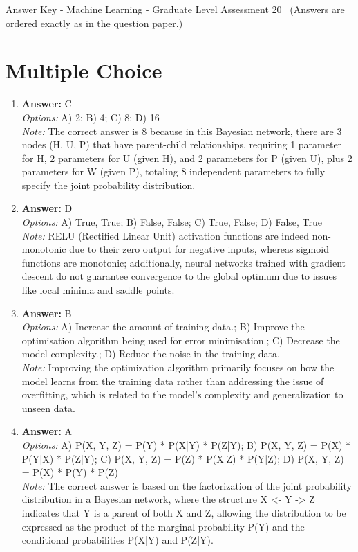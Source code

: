 \documentclass[12pt]{article}
\begin{document}
\begin{center}
Answer Key - Machine Learning - Graduate Level Assessment 20 \
\small (Answers are ordered exactly as in the question paper.)
\end{center}

\section*{Multiple Choice}
\begin{enumerate}[label=\arabic*.]
\item \textbf{Answer:} C
\\ \textit{Options:} A) 2; B) 4; C) 8; D) 16
\\ \textit{Note:} The correct answer is 8 because in this Bayesian network, there are 3 nodes (H, U, P) that have parent-child relationships, requiring 1 parameter for H, 2 parameters for U (given H), and 2 parameters for P (given U), plus 2 parameters for W (given P), totaling 8 independent parameters to fully specify the joint probability distribution.
\item \textbf{Answer:} D
\\ \textit{Options:} A) True, True; B) False, False; C) True, False; D) False, True
\\ \textit{Note:} RELU (Rectified Linear Unit) activation functions are indeed non-monotonic due to their zero output for negative inputs, whereas sigmoid functions are monotonic; additionally, neural networks trained with gradient descent do not guarantee convergence to the global optimum due to issues like local minima and saddle points.
\item \textbf{Answer:} B
\\ \textit{Options:} A) Increase the amount of training data.; B) Improve the optimisation algorithm being used for error minimisation.; C) Decrease the model complexity.; D) Reduce the noise in the training data.
\\ \textit{Note:} Improving the optimization algorithm primarily focuses on how the model learns from the training data rather than addressing the issue of overfitting, which is related to the model's complexity and generalization to unseen data.
\item \textbf{Answer:} A
\\ \textit{Options:} A) P(X, Y, Z) = P(Y) * P(X|Y) * P(Z|Y); B) P(X, Y, Z) = P(X) * P(Y|X) * P(Z|Y); C) P(X, Y, Z) = P(Z) * P(X|Z) * P(Y|Z); D) P(X, Y, Z) = P(X) * P(Y) * P(Z)
\\ \textit{Note:} The correct answer is based on the factorization of the joint probability distribution in a Bayesian network, where the structure X \textless{}- Y -\textgreater{} Z indicates that Y is a parent of both X and Z, allowing the distribution to be expressed as the product of the marginal probability P(Y) and the conditional probabilities P(X|Y) and P(Z|Y).

\end{enumerate}
\end{document}
